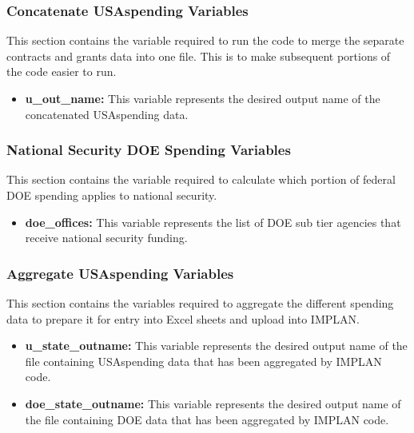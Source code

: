 \documentclass[
]{book}
\providecommand{\tightlist}{%
  \setlength{\itemsep}{0pt}\setlength{\parskip}{0pt}}
\begin{document}
\hypertarget{concatenate}{%
\subsubsection{Concatenate USAspending Variables}\label{concatenate}}

This section contains the variable required to run the code to merge the separate contracts and grants data into one file. This is to make subsequent portions of the code easier to run.

\begin{itemize}
\tightlist
\item
  \textbf{u\_out\_name:} This variable represents the desired output name of the concatenated USAspending data.
\end{itemize}

\hypertarget{doe-spend}{%
\subsubsection{National Security DOE Spending Variables}\label{doe-spend}}

This section contains the variable required to calculate which portion of federal DOE spending applies to national security.

\begin{itemize}
\tightlist
\item
  \textbf{doe\_offices:} This variable represents the list of DOE sub tier agencies that receive national security funding.
\end{itemize}

\hypertarget{aggregate}{%
\subsubsection{Aggregate USAspending Variables}\label{aggregate}}

This section contains the variables required to aggregate the different spending data to prepare it for entry into Excel sheets and upload into IMPLAN.

\begin{itemize}
\tightlist
\item
  \textbf{u\_state\_outname:} This variable represents the desired output name of the file containing USAspending data that has been aggregated by IMPLAN code.\\
\item
  \textbf{doe\_state\_outname:} This variable represents the desired output name of the file containing DOE data that has been aggregated by IMPLAN code.
\end{itemize}
\end{document}
